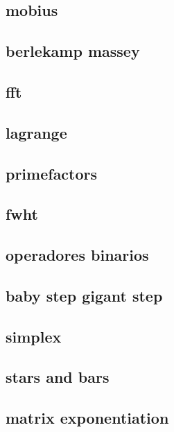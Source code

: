\subsection{mobius}
\raggedbottom
\hrulefill
\subsection{berlekamp massey}
\raggedbottom
\hrulefill
\subsection{fft}
\raggedbottom
\hrulefill
\subsection{lagrange}
\raggedbottom
\hrulefill
\subsection{primefactors}
\raggedbottom
\hrulefill
\subsection{fwht}
\raggedbottom
\hrulefill
\subsection{operadores binarios}
\raggedbottom
\hrulefill
\subsection{baby step gigant step}
\raggedbottom
\hrulefill
\subsection{simplex}
\raggedbottom
\hrulefill
\subsection{stars and bars}
\raggedbottom
\hrulefill
\subsection{matrix exponentiation}
\raggedbottom
\hrulefill
